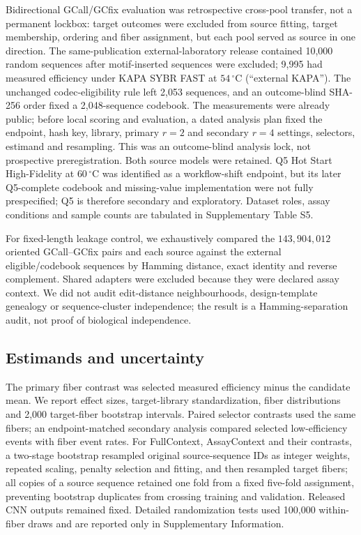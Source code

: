 \documentclass[unnumsec,webpdf,modern,large]{oup-authoring-template}
\begin{document}
Bidirectional GCall/GCfix evaluation was retrospective cross-pool transfer, not a permanent lockbox: target outcomes were excluded from source fitting, target membership, ordering and fiber assignment, but each pool served as source in one direction. The same-publication external-laboratory release contained 10,000 random sequences after motif-inserted sequences were excluded; 9,995 had measured efficiency under KAPA SYBR FAST at $54\,^{\circ}$C (``external KAPA''). The unchanged codec-eligibility rule left 2,053 sequences, and an outcome-blind SHA-256 order fixed a 2,048-sequence codebook. The measurements were already public; before local scoring and evaluation, a dated analysis plan fixed the endpoint, hash key, library, primary $r=2$ and secondary $r=4$ settings, selectors, estimand and resampling. This was an outcome-blind analysis lock, not prospective preregistration. Both source models were retained. Q5 Hot Start High-Fidelity at $60\,^{\circ}$C was identified as a workflow-shift endpoint, but its later Q5-complete codebook and missing-value implementation were not fully prespecified; Q5 is therefore secondary and exploratory. Dataset roles, assay conditions and sample counts are tabulated in Supplementary Table S5.

For fixed-length leakage control, we exhaustively compared the $143{,}904{,}012$ oriented GCall--GCfix pairs and each source against the external eligible/codebook sequences by Hamming distance, exact identity and reverse complement. Shared adapters were excluded because they were declared assay context. We did not audit edit-distance neighbourhoods, design-template genealogy or sequence-cluster independence; the result is a Hamming-separation audit, not proof of biological independence.

\subsection{Estimands and uncertainty}

The primary fiber contrast was selected measured efficiency minus the candidate mean. We report effect sizes, target-library standardization, fiber distributions and 2,000 target-fiber bootstrap intervals. Paired selector contrasts used the same fibers; an endpoint-matched secondary analysis compared selected low-efficiency events with fiber event rates. For FullContext, AssayContext and their contrasts, a two-stage bootstrap resampled original source-sequence IDs as integer weights, repeated scaling, penalty selection and fitting, and then resampled target fibers; all copies of a source sequence retained one fold from a fixed five-fold assignment, preventing bootstrap duplicates from crossing training and validation. Released CNN outputs remained fixed. Detailed randomization tests used 100,000 within-fiber draws and are reported only in Supplementary Information.
\end{document}
